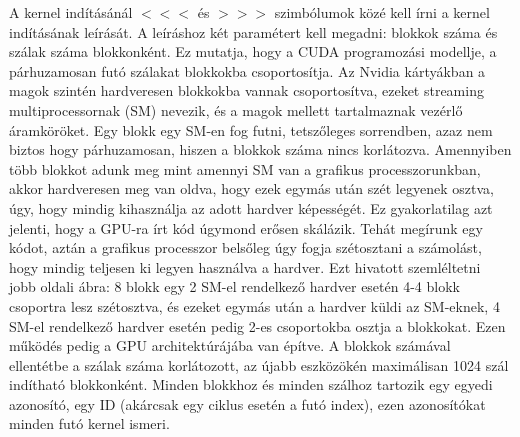 \documentclass[11pt,a4paper]{article}
\numberwithin{equation}{subsection}
\numberwithin{figure}{section}
\begin{document}
A kernel indításánál \(<\!\!<\!\!<\) és \(>\!\!>\!\!>\) szimbólumok közé kell írni a kernel indításának leírását. A leíráshoz két paramétert kell megadni: blokkok száma és szálak száma blokkonként. Ez mutatja, hogy a CUDA programozási modellje, a párhuzamosan futó szálakat blokkokba csoportosítja. Az Nvidia kártyákban a magok szintén hardveresen blokkokba vannak csoportosítva, ezeket streaming multiprocessornak (SM) nevezik, és a magok mellett tartalmaznak vezérlő áramköröket. Egy blokk egy SM-en fog futni, tetszőleges sorrendben, azaz nem biztos hogy párhuzamosan, hiszen a blokkok száma nincs korlátozva. Amennyiben több blokkot adunk meg mint amennyi SM van a grafikus processzorunkban, akkor hardveresen meg van oldva, hogy ezek egymás után szét legyenek osztva, úgy, hogy mindig kihasználja az adott hardver képességét. Ez gyakorlatilag azt jelenti, hogy a GPU-ra írt kód úgymond erősen skálázik. Tehát megírunk egy kódot, aztán a grafikus processzor belsőleg úgy fogja szétosztani a számolást, hogy mindig teljesen ki legyen használva a hardver. Ezt hivatott szemléltetni ~ jobb oldali ábra: 8 blokk egy 2 SM-el rendelkező hardver esetén 4-4 blokk csoportra lesz szétosztva, és ezeket egymás után a hardver küldi az SM-eknek, 4 SM-el rendelkező hardver esetén pedig 2-es csoportokba osztja a blokkokat. Ezen működés pedig a GPU architektúrájába van építve. A blokkok számával ellentétbe a szálak száma korlátozott, az újabb eszközökén maximálisan 1024 szál indítható blokkonként. Minden blokkhoz és minden szálhoz tartozik egy egyedi azonosító, egy ID (akárcsak egy ciklus esetén a futó index), ezen azonosítókat minden futó kernel ismeri.
\end{document}
